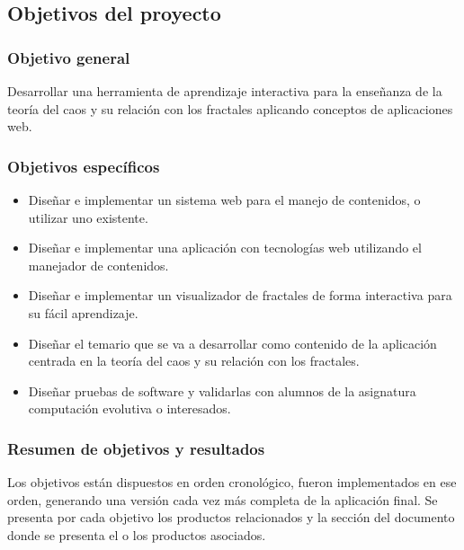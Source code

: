 \documentclass[letterpaper, 11pt, oneside]{article}
\theoremstyle{definition}
\theoremstyle{remark}
\begin{document}
\subsection{Objetivos del proyecto} 
\subsubsection{Objetivo general} 
Desarrollar una herramienta de aprendizaje interactiva para la enseñanza de la teoría del caos y su relación con los fractales aplicando conceptos de aplicaciones web.

\subsubsection{Objetivos específicos}
\begin{itemize}
\item Diseñar e implementar un sistema web para el manejo de contenidos, o utilizar uno existente.
\item Diseñar e implementar una aplicación con tecnologías web utilizando el manejador de contenidos.
\item Diseñar e implementar un visualizador de fractales de forma interactiva para su fácil aprendizaje.
\item Diseñar el temario que se va a desarrollar como contenido de la aplicación centrada en la teoría del caos y su relación con los fractales.
\item Diseñar pruebas de software y validarlas con alumnos de la asignatura computación evolutiva o interesados.
\end{itemize}

\subsubsection{Resumen de objetivos y resultados}
Los objetivos están dispuestos en orden cronológico, fueron implementados en ese orden, generando una versión cada vez más completa de la aplicación final. Se presenta por cada objetivo los productos relacionados y la sección del documento donde se presenta el o los productos asociados.
\end{document}
